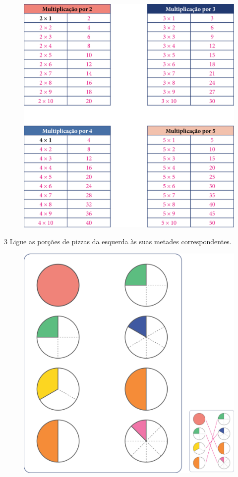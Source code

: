 \begin{figure}[htpb!]
\includegraphics[width=\textwidth]{./media/image105.png}
\end{figure}

\pagebreak
\num{3} Ligue as porções de pizzas da esquerda às suas metades correspondentes.

\begin{figure}[htpb!]
\includegraphics[width=\textwidth]{./media/image106.png}
\end{figure}


